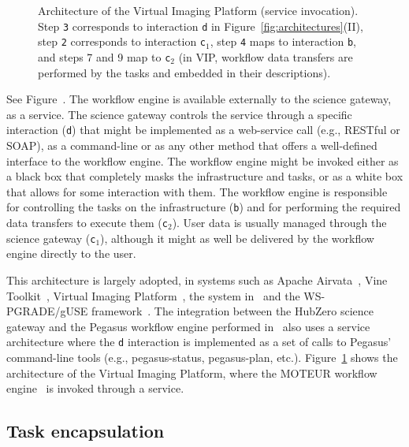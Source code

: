 \documentclass[preprint,3p,twocolumn]{elsarticle}
\newcommand{\note}[2]{\pdfmargincomment[color=yellow,author=#1,open=true]{#2}}
\newcommand{\closednote}[4]{} %
\begin{document}
\begin{figure}
\centering
\def\svgwidth{1.5\columnwidth}

\caption{Architecture of the Virtual Imaging Platform (service
  invocation).  Step \texttt{3} corresponds to interaction \texttt{d}
  in Figure~\ref{fig:architectures}(II), step \texttt{2} corresponds to
  interaction \texttt{c$_1$}, step \texttt{4} maps to interaction
  \texttt{b}, and steps 7 and 9 map to \texttt{c$_2$} (in VIP, workflow data transfers are
  performed by the tasks and embedded in their descriptions).}
\label{fig:vip-architecture}
\end{figure}

See Figure~. The workflow engine is available
externally to the science gateway, as a service. The science gateway
controls the service through a specific interaction (\texttt{d}) that
might be implemented as a web-service call (e.g., RESTful or SOAP), as
a command-line or as any other method that offers a well-defined
interface to the workflow engine. The workflow engine might be invoked
either as a black box that completely masks the infrastructure and
tasks, or as a white box that allows for some interaction with
them. The workflow engine is responsible for controlling the tasks on
the infrastructure (\texttt{b}) and for performing the required data
transfers to execute them (\texttt{c$_2$}). User data is usually
managed through the science gateway (\texttt{c$_1$}), although it
might as well be delivered by the workflow engine directly to the
user.

This architecture is largely adopted, in systems such as Apache
Airvata~\cite{marru2011apache}, Vine
Toolkit~\cite{DBLP:journals/scpe/SzejnfeldDKKKKLPTWDNW10}, Virtual
Imaging Platform~\cite{GLAT-13}, the system
in~\cite{wu2010accelerating} and the WS-PGRADE/gUSE
framework~\cite{Kacsuk2012}. The integration between the
HubZero science gateway and the Pegasus workflow engine performed
in~\cite{CPE:CPE3257} also uses a service architecture where the
\texttt{d} interaction is implemented as a set of calls to Pegasus'
command-line tools (e.g., pegasus-status, pegasus-plan,
etc.). Figure~\ref{fig:vip-architecture} shows the architecture of the
Virtual Imaging Platform, where the MOTEUR workflow
engine~\cite{GLAT-08i} is invoked through a service.

\subsection{Task encapsulation}
\closednote{Marc-e}{May I propose
  another name here? Either "Task-centric" or "Task Oriented". My
  reasoning is that the WE is just another task, as well as the
  sub-tasks themselves.}{Tristan}{I agree: sub-tasking is not the
  integration model, it is the process that engines use when they
  are integrated as tasks. I think 'task encapsulation' is more
  consistent  with 'service invocation' than 'task-oriented'}
\end{document}
